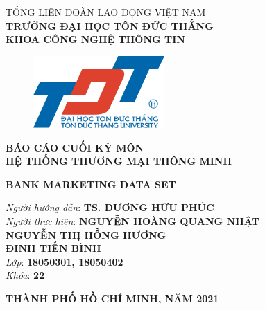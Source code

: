 \documentclass{report}
\begin{document}
\begin{center}
	\fontsize{14}{20}\selectfont
	\textsc{TỔNG LIÊN ĐOÀN LAO ĐỘNG VIỆT NAM\\ 
		\textbf{TRƯỜNG ĐẠI HỌC TÔN ĐỨC THẮNG\\} 
		\textbf{KHOA CÔNG NGHỆ THÔNG TIN}}
	
	\vspace{0.08cm}
	\begin{figure}[htp]
		\begin{center}
			\includegraphics[width=5cm]{images/TĐT_logo.png}
		\end{center}
	\end{figure}
	
	\fontsize{15}{20}\selectfont\textbf{BÁO CÁO CUỐI KỲ MÔN\\HỆ THỐNG THƯƠNG MẠI THÔNG MINH\\}
	
	\vspace{2cm}
	\fontsize{24}{20}\selectfont\textbf{BANK MARKETING DATA SET}
\end{center}
\vspace{1.5cm}

\begin{flushright}
	\fontsize{14}{20}\selectfont
	\textit{Người hướng dẫn}: \textbf{TS. DƯƠNG HỮU PHÚC}\\
	\textit{Người thực hiện}:
	\textbf{NGUYỄN HOÀNG QUANG NHẬT}\\
	\textbf{NGUYỄN THỊ HỒNG HƯƠNG}\\
	\textbf{ĐINH TIẾN BÌNH}\\
	\textit{Lớp}: \textbf{18050301, 18050402}\\
	\textit{Khóa}: \textbf{22}\\
\end{flushright}
\vspace{2cm}
\begin{center}
	\fontsize{14}{20}\selectfont
	\textbf{THÀNH PHỐ HỒ CHÍ MINH, NĂM 2021}
\end{center}
\pagebreak

\end{document}
